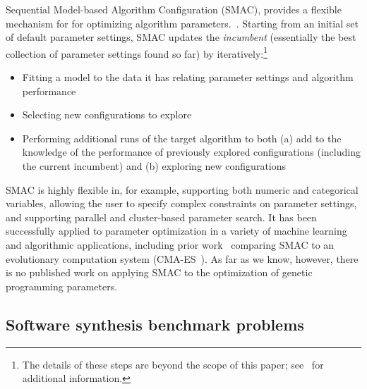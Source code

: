 Sequential Model-based Algorithm Configuration (SMAC),
provides a flexible mechanism for for optimizing algorithm 
parameters.~\cite{HutHooLey11-SMAC}. Starting from an initial set of default
parameter settings, SMAC updates the \emph{incumbent} (essentially the
best collection of parameter settings found so far) by 
iteratively:\footnote{The details of these steps are beyond the scope of this 
	paper; see~\cite{HutHooLey11-SMAC} for additional information.}
\begin{itemize}
	\item Fitting a model to the data it has relating parameter settings and algorithm performance
	\item Selecting new configurations to explore
	\item Performing additional runs of the target algorithm to both (a)
	add to the knowledge of the performance of previously explored
	configurations (including the current incumbent) and
	(b) exploring new configurations
\end{itemize}

SMAC is highly flexible in, for example, supporting both numeric and
categorical variables, allowing the user to specify complex constraints
on parameter settings, and supporting parallel and cluster-based
parameter search. It has been successfully applied to parameter
optimization in a variety of machine learning and algorithmic 
applications, including prior 
work~\cite{hutter2013evaluation} comparing SMAC to an
evolutionary computation system (CMA-ES~\cite{hansen1996adapting}).
As far as we know, however, there is no published work on applying SMAC to
the optimization of genetic programming parameters.

\subsection{Software synthesis benchmark problems}
\label{sec:benchmarkProblems}

